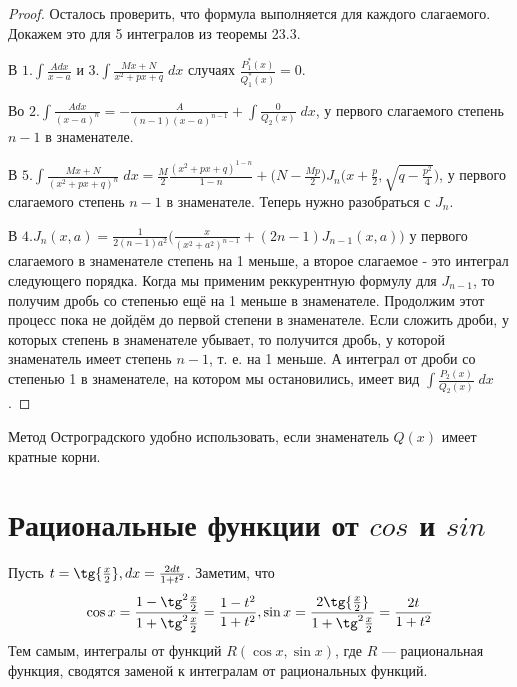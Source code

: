 \begin{proof}
		Осталось проверить, что формула выполняется для каждого слагаемого. Докажем это для 5 интегралов из теоремы 23.3.
		
		В $1. \displaystyle\int \frac{Adx}{x - a}$ и $3. \displaystyle\int \frac{Mx + N}{x^2 + px + q} \; dx$ случаях $\frac{P^*_1(x)}{Q^*_1(x)} = 0.$
		
		Во $2. \displaystyle\int \frac{Adx}{(x - a)^n} = -\frac{A}{(n - 1)(x - a)^{n - 1}} + \displaystyle\int \frac{0}{Q_2(x)} \; dx$, у первого слагаемого степень $n - 1$ в знаменателе.
		
		В $5. \displaystyle\int \frac{Mx + N}{(x^2 + px + q)^n} \; dx = \frac{M}{2} \frac{(x^2 + px + q)^{1 - n}}{1 - n} + \bigg(N - \frac{Mp}{2}\bigg) J_n \bigg(x + \frac{p}{2}, \sqrt{q - \frac{p^2}{4}}\bigg)$, у первого слагаемого степень $n - 1$ в знаменателе. Теперь нужно разобраться с $J_n$.
		
		В $4.\displaystyle J_{n}(x, a) = \frac{1}{2(n - 1)a^2} \bigg(\frac{x}{(x^2 + a^2)^{n - 1}} + (2n - 1)J_{n - 1}(x, a)\bigg)$ у первого слагаемого в знаменателе степень на 1 меньше, а второе слагаемое - это интеграл следующего порядка. Когда мы применим реккурентную формулу для $J_{n - 1}$, то получим дробь со степенью ещё на 1 меньше в знаменателе. Продолжим этот процесс пока не дойдём до первой степени в знаменателе. Если сложить дроби, у которых степень в знаменателе убывает, то получится дробь, у которой знаменатель имеет степень $n - 1$, т. е. на 1 меньше. А интеграл от дроби со степенью 1 в знаменателе, на котором мы остановились, имеет вид $\displaystyle\int \frac{P_2(x)}{Q_2(x)} \; dx$.
	\end{proof}
	
	\begin{mention}
		Метод Остроградского удобно использовать, если знаменатель $Q(x)$ имеет кратные корни.
	\end{mention}
	
	\section{Рациональные функции от $cos$ и $sin$}
	
	\begin{example}
		Пусть $t = \tg{\frac{x}{2}}, dx = \frac{2dt}{1 + t^2}$. Заметим, что
		\[ \cos{x} = \frac{1 - \tg^2{\frac{x}{2}}}{1 + \tg^2{\frac{x}{2}}} = \frac{1 - t^2}{1 + t^2}, \sin{x} = \frac{2\tg{\frac{x}{2}}}{1 + \tg^2{\frac{x}{2}}} = \frac{2t}{1 + t^2} \]
		Тем самым, интегралы от функций $R(\cos{x},\sin{x})$, где $R$ —
		рациональная функция, сводятся заменой к интегралам от
		рациональных функций.
	\end{example}
	
